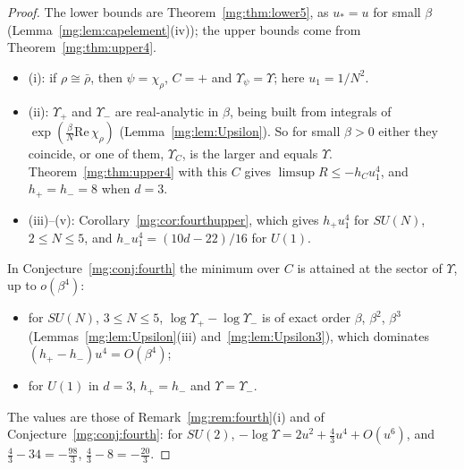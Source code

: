 \documentclass[11pt,a4paper]{article}
\theoremstyle{definition}
\theoremstyle{remark}
\begin{document}
\begin{proof}
The lower bounds are Theorem~\ref{mg:thm:lower5}, as $u_*=u$ for small $\beta$ (Lemma~\ref{mg:lem:capelement}(iv)); the upper bounds come from Theorem~\ref{mg:thm:upper4}.
\begin{itemize}
\item (i): if $\rho\cong\bar\rho$, then $\psi=\chi_\rho$, $C=+$ and $\Upsilon_\psi=\Upsilon$; here $u_1=1/N^2$.
\item (ii): $\Upsilon_+$ and $\Upsilon_-$ are real-analytic in $\beta$, being built from integrals of $\exp(\frac\beta N\mathrm{Re}\,\chi_\rho)$ (Lemma~\ref{mg:lem:Upsilon}). So for small $\beta>0$
either they coincide, or one of them, $\Upsilon_C$, is the larger and equals $\Upsilon$. Theorem~\ref{mg:thm:upper4} with this $C$ gives $\limsup R\le-h_Cu_1^4$, and
$h_+=h_-=8$ when $d=3$.
\item (iii)--(v): Corollary~\ref{mg:cor:fourthupper}, which gives $h_+u_1^4$ for $SU(N)$, $2\le N\le5$, and $h_-u_1^4=(10d-22)/16$ for $U(1)$.
\end{itemize}
In Conjecture~\ref{mg:conj:fourth} the minimum over $C$ is attained at the sector of $\Upsilon$, up to $o(\beta^4)$:
\begin{itemize}
\item for $SU(N)$, $3\le N\le5$, $\log\Upsilon_+-\log\Upsilon_-$ is of exact order $\beta$, $\beta^2$, $\beta^3$ (Lemmas~\ref{mg:lem:Upsilon}(iii) and~\ref{mg:lem:Upsilon3}), which dominates
$(h_+-h_-)u^4=O(\beta^4)$;
\item for $U(1)$ in $d=3$, $h_+=h_-$ and $\Upsilon=\Upsilon_-$.
\end{itemize}
The values are those of Remark~\ref{mg:rem:fourth}(i) and of Conjecture~\ref{mg:conj:fourth}: for $SU(2)$, $-\log\Upsilon=2u^2+\frac43u^4+O(u^6)$, and $\frac43-34=-\frac{98}3$,
$\frac43-8=-\frac{20}3$.
\end{proof}
\end{document}
